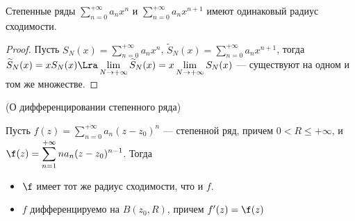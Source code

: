 \begin{lemma}
    Степенные ряды $\displaystyle \sum_{n = 0}^{+\infty}{a_n x^n}$ и
    $\displaystyle \sum_{n = 0}^{+\infty}{a_n x^{n + 1}}$ имеют одинаковый
    радиус сходимости.
\end{lemma}
\begin{proof}
    Пусть $S_N(x) = \displaystyle \sum_{n = 0}^{+\infty}{a_n x^n}$,
    $\widetilde{S}_N(x) = \displaystyle \sum_{n = 0}^{+\infty}{a_n x^{n + 1}}$,
    тогда $\widetilde{S}_N(x) = xS_N(x) \Lra \displaystyle \lim_{N \to
    +\infty}{\widetilde{S}_N(x)} = x\lim_{N \to +\infty}{S_N(x)}$ --- существуют
    на одном и том же множестве.
\end{proof}

\begin{theorem}(О дифференцировании степенного ряда)

    Пусть $\displaystyle f(z) = \sum_{n = 0}^{+\infty}{a_n (z - z_0)^n}$ ---
    степенной ряд, причем $0 < R \leqslant +\infty$, и $\displaystyle \f(z) =
    \sum_{n = 1}^{+\infty}{n a_n (z - z_0)^{n - 1}}$. Тогда
    \begin{itemize}
        \item $\f$ имеет тот же радиус сходимости, что и $f$.
        \item $f$ дифференцируемо на $B(z_0, R)$, причем $f'(z) = \f(z)$
    \end{itemize}
\end{theorem}
